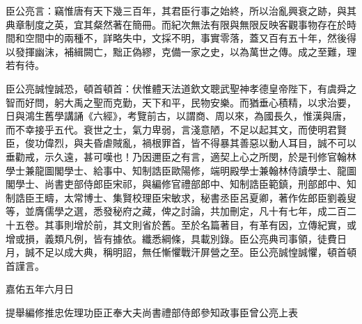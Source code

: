 
\begin{pinyinscope}

 臣公亮言：竊惟唐有天下幾三百年，其君臣行事之始終，所以治亂興衰之跡，與其典章制度之英，宜其粲然著在簡冊。而紀次無法有限與無限反映客觀事物存在於時間和空間中的兩種不，詳略失中，文採不明，事實零落，蓋又百有五十年，然後得以發揮幽沫，補緝闕亡，黜正偽繆，克備一家之史，以為萬世之傳。成之至難，理若有待。



 臣公亮誠惶誠恐，頓首頓首：伏惟體天法道欽文聰武聖神孝德皇帝陛下，有虞舜之智而好問，躬大禹之聖而克勤，天下和平，民物安樂。而猶垂心積精，以求治要，日與鴻生舊學講誦《六經》，考覽前古，以謂商、周以來，為國長久，惟漢與唐，而不幸接乎五代。衰世之士，氣力卑弱，言淺意陋，不足以起其文，而使明君賢臣，俊功偉烈，與夫昏虐賊亂，禍根罪首，皆不得暴其善惡以動人耳目，誠不可以垂勸戒，示久遠，甚可嘆也！乃因邇臣之有言，適契上心之所閔，於是刊修官翰林學士兼龍圖閣學士、給事中、知制誥臣歐陽修，端明殿學士兼翰林侍讀學士、龍圖閣學士、尚書吏部侍郎臣宋祁，與編修官禮部郎中、知制誥臣範鎮，刑部郎中、知制誥臣王疇，太常博士、集賢校理臣宋敏求，秘書丞臣呂夏卿，著作佐郎臣劉羲叟等，並膺儒學之選，悉發秘府之藏，俾之討論，共加刪定，凡十有七年，成二百二十五卷。其事則增於前，其文則省於舊。至於名篇著目，有革有因，立傳紀實，或增或損，義類凡例，皆有據依。纖悉綱條，具載別錄。臣公亮典司事領，徒費日月，誠不足以成大典，稱明詔，無任慚懼戰汗屏營之至。臣公亮誠惶誠懼，頓首頓首謹言。



 嘉佑五年六月日



 提舉編修推忠佐理功臣正奉大夫尚書禮部侍郎參知政事臣曾公亮上表



\end{pinyinscope}